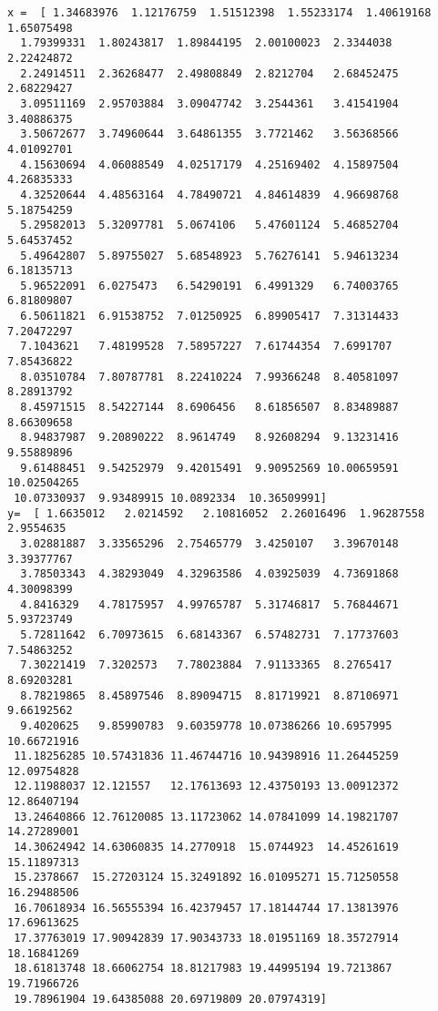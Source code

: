 \documentclass[11pt]{article}
\begin{document}
    \begin{Verbatim}[commandchars=\\\{\}]
x =  [ 1.34683976  1.12176759  1.51512398  1.55233174  1.40619168  1.65075498
  1.79399331  1.80243817  1.89844195  2.00100023  2.3344038   2.22424872
  2.24914511  2.36268477  2.49808849  2.8212704   2.68452475  2.68229427
  3.09511169  2.95703884  3.09047742  3.2544361   3.41541904  3.40886375
  3.50672677  3.74960644  3.64861355  3.7721462   3.56368566  4.01092701
  4.15630694  4.06088549  4.02517179  4.25169402  4.15897504  4.26835333
  4.32520644  4.48563164  4.78490721  4.84614839  4.96698768  5.18754259
  5.29582013  5.32097781  5.0674106   5.47601124  5.46852704  5.64537452
  5.49642807  5.89755027  5.68548923  5.76276141  5.94613234  6.18135713
  5.96522091  6.0275473   6.54290191  6.4991329   6.74003765  6.81809807
  6.50611821  6.91538752  7.01250925  6.89905417  7.31314433  7.20472297
  7.1043621   7.48199528  7.58957227  7.61744354  7.6991707   7.85436822
  8.03510784  7.80787781  8.22410224  7.99366248  8.40581097  8.28913792
  8.45971515  8.54227144  8.6906456   8.61856507  8.83489887  8.66309658
  8.94837987  9.20890222  8.9614749   8.92608294  9.13231416  9.55889896
  9.61488451  9.54252979  9.42015491  9.90952569 10.00659591 10.02504265
 10.07330937  9.93489915 10.0892334  10.36509991]
y=  [ 1.6635012   2.0214592   2.10816052  2.26016496  1.96287558  2.9554635
  3.02881887  3.33565296  2.75465779  3.4250107   3.39670148  3.39377767
  3.78503343  4.38293049  4.32963586  4.03925039  4.73691868  4.30098399
  4.8416329   4.78175957  4.99765787  5.31746817  5.76844671  5.93723749
  5.72811642  6.70973615  6.68143367  6.57482731  7.17737603  7.54863252
  7.30221419  7.3202573   7.78023884  7.91133365  8.2765417   8.69203281
  8.78219865  8.45897546  8.89094715  8.81719921  8.87106971  9.66192562
  9.4020625   9.85990783  9.60359778 10.07386266 10.6957995  10.66721916
 11.18256285 10.57431836 11.46744716 10.94398916 11.26445259 12.09754828
 12.11988037 12.121557   12.17613693 12.43750193 13.00912372 12.86407194
 13.24640866 12.76120085 13.11723062 14.07841099 14.19821707 14.27289001
 14.30624942 14.63060835 14.2770918  15.0744923  14.45261619 15.11897313
 15.2378667  15.27203124 15.32491892 16.01095271 15.71250558 16.29488506
 16.70618934 16.56555394 16.42379457 17.18144744 17.13813976 17.69613625
 17.37763019 17.90942839 17.90343733 18.01951169 18.35727914 18.16841269
 18.61813748 18.66062754 18.81217983 19.44995194 19.7213867  19.71966726
 19.78961904 19.64385088 20.69719809 20.07974319]

    \end{Verbatim}
\end{document}
